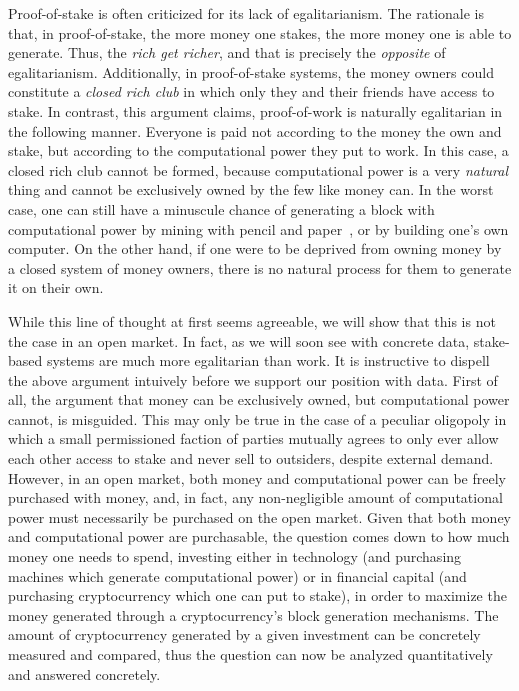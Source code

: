 Proof-of-stake is often criticized for its lack of egalitarianism. The rationale
is that, in proof-of-stake, the more money one stakes, the more money one is
able to generate. Thus, the \emph{rich get richer}, and that is precisely the
\emph{opposite} of egalitarianism. Additionally, in proof-of-stake systems, the
money owners could constitute a \emph{closed rich club} in which only they and
their friends have access to stake. In contrast, this argument claims,
proof-of-work is naturally egalitarian in the following manner. Everyone is paid
not according to the money the own and stake, but according to the computational
power they put to work. In this case, a closed rich club cannot be formed,
because computational power is a very \emph{natural} thing and cannot be
exclusively owned by the few like money can. In the worst case, one can still
have a minuscule chance of generating a block with computational power by mining
with pencil and paper~\cite{paper-mining}, or by building one's own computer. On
the other hand, if one were to be deprived from owning money by a closed system
of money owners, there is no natural process for them to generate it on their
own.

While this line of thought at first seems agreeable, we will show that this
is not the case in an open market. In fact, as we will soon see with concrete
data, stake-based systems are much more egalitarian than work. It is instructive
to dispell the above argument intuively before we support our position with
data. First of all, the argument that money can be exclusively owned, but
computational power cannot, is misguided. This may only be true in the case of
a peculiar oligopoly in which a small permissioned faction of parties mutually
agrees to only ever allow each other access to stake and never sell to
outsiders, despite external demand. However, in an open market, both money and
computational power can be freely purchased with money, and, in fact, any
non-negligible amount of computational power must necessarily be purchased on
the open market. Given that both money and computational power are purchasable,
the question comes down to how much money one needs to spend, investing either
in technology (and purchasing machines which generate computational power) or in
financial capital (and purchasing cryptocurrency which one can put to stake), in
order to maximize the money generated through a cryptocurrency's block
generation mechanisms. The amount of cryptocurrency generated by a given
investment can be concretely measured and compared, thus the question can now be
analyzed quantitatively and answered concretely.
